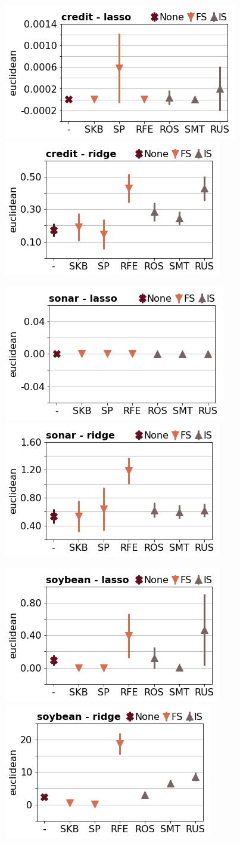 \documentclass[runningheads,a4paper]{llncs}
\begin{document}
\begin{figure}[!h]
\includegraphics[width=0.32\linewidth]{fig/preps_credit_LM_lasso_euclidean.png}
\includegraphics[width=0.32\linewidth]{fig/preps_credit_LM_ridge_euclidean.png}
\end{figure}


\begin{figure}[!h]
\includegraphics[width=0.32\linewidth]{fig/preps_sonar_LM_lasso_euclidean.png}
\includegraphics[width=0.32\linewidth]{fig/preps_sonar_LM_ridge_euclidean.png}
\end{figure}


\begin{figure}[!h]
\includegraphics[width=0.32\linewidth]{fig/preps_soybean_LM_lasso_euclidean.png}
\includegraphics[width=0.32\linewidth]{fig/preps_soybean_LM_ridge_euclidean.png}
\end{figure}
\end{document}
